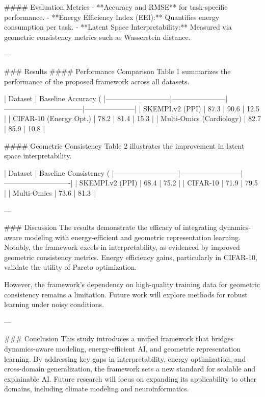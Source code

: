 #### Evaluation Metrics  
- **Accuracy and RMSE** for task-specific performance.  
- **Energy Efficiency Index (EEI):** Quantifies energy consumption per task.  
- **Latent Space Interpretability:** Measured via geometric consistency metrics such as Wasserstein distance.

---

### Results  
#### Performance Comparison  
Table 1 summarizes the performance of the proposed framework across all datasets.  

| Dataset                   | Baseline Accuracy (%
|---------------------------|-----------------------|---------------------------------|---------------------|  
| SKEMPI.v2 (PPI)           | 87.3                 | 90.6                            | 12.5                |  
| CIFAR-10 (Energy Opt.)    | 78.2                 | 81.4                            | 15.3                |  
| Multi-Omics (Cardiology)  | 82.7                 | 85.9                            | 10.8                |  

#### Geometric Consistency  
Table 2 illustrates the improvement in latent space interpretability.  

| Dataset                   | Baseline Consistency (%
|---------------------------|--------------------------|----------------------------|  
| SKEMPI.v2 (PPI)           | 68.4                    | 75.2                       |  
| CIFAR-10                  | 71.9                    | 79.5                       |  
| Multi-Omics               | 73.6                    | 81.3                       |  

---

### Discussion  
The results demonstrate the efficacy of integrating dynamics-aware modeling with energy-efficient and geometric representation learning. Notably, the framework excels in interpretability, as evidenced by improved geometric consistency metrics. Energy efficiency gains, particularly in CIFAR-10, validate the utility of Pareto optimization.

However, the framework's dependency on high-quality training data for geometric consistency remains a limitation. Future work will explore methods for robust learning under noisy conditions.

---

### Conclusion  
This study introduces a unified framework that bridges dynamics-aware modeling, energy-efficient AI, and geometric representation learning. By addressing key gaps in interpretability, energy optimization, and cross-domain generalization, the framework sets a new standard for scalable and explainable AI. Future research will focus on expanding its applicability to other domains, including climate modeling and neuroinformatics.

